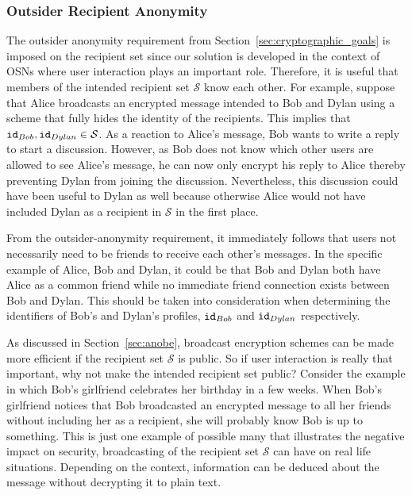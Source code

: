 \subsubsection{Outsider Recipient Anonymity}
The outsider anonymity requirement from Section~\ref{sec:cryptographic_goals} is imposed on the recipient set since our solution is developed in the context of OSNs where user interaction plays an important role. Therefore, it is useful that members of the intended recipient set $\mathcal{S}$ know each other. For example, suppose that Alice broadcasts an encrypted message intended to Bob and Dylan using a scheme that fully hides the identity of the recipients. This implies that $\mathtt{id}_{Bob}, \mathtt{id}_{Dylan} \in \mathcal{S}$. As a reaction to Alice's message, Bob wants to write a reply to start a discussion. However, as Bob does not know which other users are allowed to see Alice's message, he can now only encrypt his reply to Alice thereby preventing Dylan from joining the discussion. Nevertheless, this discussion could have been useful to Dylan as well because otherwise Alice would not have included Dylan as a recipient in $\mathcal{S}$ in the first place.

From the outsider-anonymity requirement, it immediately follows that users not necessarily need to be friends to receive each other's messages. In the specific example of Alice, Bob and Dylan, it could be that Bob and Dylan both have Alice as a common friend while no immediate friend connection exists between Bob and Dylan. This should be taken into consideration when determining the identifiers of Bob's and Dylan's profiles, $\mathtt{id}_{Bob}$ and $\mathtt{id}_{Dylan}$ respectively.

As discussed in Section~\ref{sec:anobe}, broadcast encryption schemes can be made more efficient if the recipient set $\mathcal{S}$ is public. So if user interaction is really that important, why not make the intended recipient set public? Consider the example in which Bob's girlfriend celebrates her birthday in a few weeks. When Bob's girlfriend notices that Bob broadcasted an encrypted message to all her friends without including her as a recipient, she will probably know Bob is up to something. This is just one example of possible many that illustrates the negative impact on security, broadcasting of the recipient set $\mathcal{S}$ can have on real life situations. Depending on the context, information can be deduced about the message without decrypting it to plain text.

